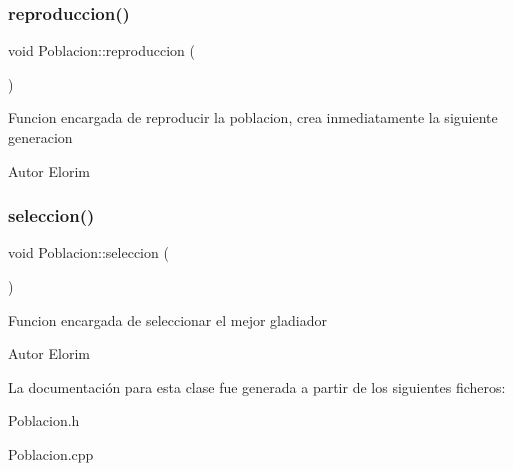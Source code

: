 \subsubsection{\texorpdfstring{reproduccion()}{reproduccion()}}
{\footnotesize\ttfamily void Poblacion\+::reproduccion (\begin{DoxyParamCaption}{ }\end{DoxyParamCaption})}

Funcion encargada de reproducir la poblacion, crea inmediatamente la siguiente generacion \begin{DoxyAuthor}{Autor}
Elorim 
\end{DoxyAuthor}
\mbox{\label{classPoblacion_ad2ad3c0864289c0ad9a82780d00dff4f}} 
\subsubsection{\texorpdfstring{seleccion()}{seleccion()}}
{\footnotesize\ttfamily void Poblacion\+::seleccion (\begin{DoxyParamCaption}{ }\end{DoxyParamCaption})}

Funcion encargada de seleccionar el mejor gladiador \begin{DoxyAuthor}{Autor}
Elorim 
\end{DoxyAuthor}


La documentación para esta clase fue generada a partir de los siguientes ficheros\+:\begin{DoxyCompactItemize}
\item 
Poblacion.\+h\item 
Poblacion.\+cpp\end{DoxyCompactItemize}
